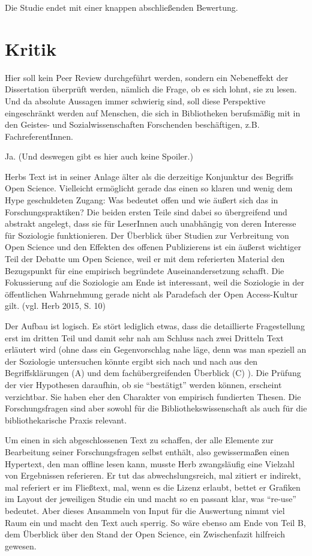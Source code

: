 \documentclass[a4paper,
fontsize=11pt,
oneside,
numbers=noperiodatend,
parskip=half-,
bibliography=totoc,
final
]{scrartcl}
\begin{document}
Die Studie endet mit einer knappen abschließenden Bewertung.

\section*{Kritik}\label{kritik}

Hier soll kein Peer Review durchgeführt werden, sondern ein Nebeneffekt
der Dissertation überprüft werden, nämlich die Frage, ob es sich lohnt,
sie zu lesen. Und da absolute Aussagen immer schwierig sind, soll diese
Perspektive eingeschränkt werden auf Menschen, die sich in Bibliotheken
berufsmäßig mit in den Geistes- und Sozialwissenschaften Forschenden
beschäftigen, z.B. FachreferentInnen.

Ja. (Und deswegen gibt es hier auch keine Spoiler.)

Herbs Text ist in seiner Anlage älter als die derzeitige Konjunktur des
Begriffs Open Science. Vielleicht ermöglicht gerade das einen so klaren
und wenig dem Hype geschuldeten Zugang: Was bedeutet offen und wie
äußert sich das in Forschungspraktiken? Die beiden ersten Teile sind
dabei so übergreifend und abstrakt angelegt, dass sie für LeserInnen
auch unabhängig von deren Interesse für Soziologie funktionieren. Der
Überblick über Studien zur Verbreitung von Open Science und den Effekten
des offenen Publizierens ist ein äußerst wichtiger Teil der Debatte um
Open Science, weil er mit dem referierten Material den Bezugspunkt für
eine empirisch begründete Auseinandersetzung schafft. Die Fokussierung
auf die Soziologie am Ende ist interessant, weil die Soziologie in der
öffentlichen Wahrnehmung gerade nicht als Paradefach der Open
Access-Kultur gilt. (vgl. Herb 2015, S. 10)

Der Aufbau ist logisch. Es stört lediglich etwas, dass die detaillierte
Fragestellung erst im dritten Teil und damit sehr nah am Schluss nach
zwei Dritteln Text erläutert wird (ohne dass ein Gegenvorschlag nahe
läge, denn was man speziell an der Soziologie untersuchen könnte ergibt
sich nach und nach aus den Begriffsklärungen (A) und dem
fachübergreifenden Überblick (C) ). Die Prüfung der vier Hypothesen
daraufhin, ob sie \enquote{bestätigt} werden können, erscheint
verzichtbar. Sie haben eher den Charakter von empirisch fundierten
Thesen. Die Forschungsfragen sind aber sowohl für die
Bibliothekswissenschaft als auch für die bibliothekarische Praxis
relevant.

Um einen in sich abgeschlossenen Text zu schaffen, der alle Elemente zur
Bearbeitung seiner Forschungsfragen selbst enthält, also gewissermaßen
einen Hypertext, den man offline lesen kann, musste Herb zwangsläufig
eine Vielzahl von Ergebnissen referieren. Er tut das abwechslungsreich,
mal zitiert er indirekt, mal referiert er im Fließtext, mal, wenn es die
Lizenz erlaubt, bettet er Grafiken im Layout der jeweiligen Studie ein
und macht so en passant klar, was \enquote{re-use} bedeutet. Aber dieses
Ansammeln von Input für die Auswertung nimmt viel Raum ein und macht den
Text auch sperrig. So wäre ebenso am Ende von Teil B, dem Überblick über
den Stand der Open Science, ein Zwischenfazit hilfreich gewesen.
\end{document}
